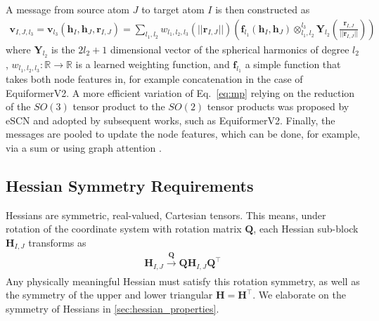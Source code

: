 \documentclass[pdflatex,sn-mathphys-num]{sn-jnl}%
\theoremstyle{thmstyleone}%
\theoremstyle{thmstyletwo}%
\theoremstyle{thmstylethree}%
\begin{document}
A message from source atom $J$ to target atom $I$ is then constructed as
\begin{align}
    \mathbf{v}_{I,J, l_3} = \mathbf{v}_{l_3}(\mathbf{h}_I, \mathbf{h}_J, \mathbf{r}_{I,J}) = \sum_{l_1, l_2} w_{l_1, l_2, l_3}(||\mathbf{r}_{I,J}||) \left( \mathbf{f}_{l_1}(\mathbf{h}_{I},\mathbf{h}_{J}) \otimes_{l_1, l_2}^{l_3} \mathbf{Y}_{l_2}\left(\frac{\mathbf{r}_{I,J}}{||\mathbf{r}_{I,J}||}\right) \right) \label{eq:mp}
\end{align}
where $\mathbf{Y}_{l_2}$ is the $2l_2+1$ dimensional vector of the spherical harmonics of degree $l_2$, $w_{l_1, l_2, l_3}: \mathbb{R} \rightarrow \mathbb{R}$ is a learned weighting function, and $\mathbf{f}_{l_1}$ a simple function that takes both node features in, for example concatenation in the case of EquiformerV2.
A more efficient variation of Eq.~\eqref{eq:mp} relying on the reduction of the $SO(3)$ tensor product to the $SO(2)$ tensor products was proposed by eSCN \citep{eSCN2023} and adopted by subsequent works, such as EquiformerV2.
Finally, the messages are pooled to update the node features, which can be done, for example, via a sum or using graph attention \citep{liao2023equiformerv2}.

\subsection{Hessian Symmetry Requirements}
Hessians are symmetric, real-valued, Cartesian tensors. This means, under rotation of the coordinate system with rotation matrix $\mathbf{Q}$, each Hessian sub-block $\mathbf{H}_{I,J}$ transforms as 
\begin{align}
    \mathbf{H}_{I,J} \xrightarrow[]{\mathbf{Q}} \mathbf{Q} \mathbf{H}_{I,J} \mathbf{Q}^\top \label{eq:hessian_symmetry}
\end{align}
Any physically meaningful Hessian must satisfy this rotation symmetry, as well as the symmetry of the upper and lower triangular $\mathbf{H}=\mathbf{H}^\top$. We elaborate on the symmetry of Hessians in \ref{sec:hessian_properties}.
\end{document}
